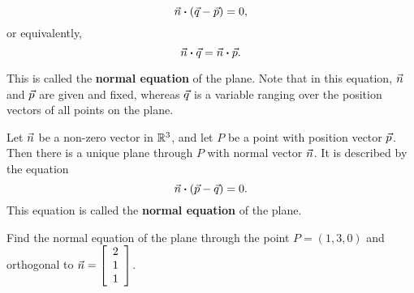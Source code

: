 \documentclass{ximera}
\begin{document}
\begin{equation*}
  \vect{n} \dotprod (\vect{q}-\vect{p}) = 0,
\end{equation*}
or equivalently,
\begin{equation*}
  \vect{n} \dotprod \vect{q} = \vect{n} \dotprod \vect{p}.
\end{equation*}

This is called the \textbf{normal equation} of the plane. Note that in
this equation, $\vect{n}$ and $\vect{p}$ are given and fixed, whereas
$\vect{q}$ is a variable ranging over the position vectors of all
points on the plane.



\begin{definition}\label{def:normal-equation-plane}

  Let $\vect{n}$ be a non-zero vector in $\R^3$, and let $P$ be a
  point with position vector $\vect{p}$. Then there is a unique plane through
  $P$ with normal vector $\vect{n}$. It is described by the equation
  \begin{equation*}
    \vect{n} \dotprod (\vec{p}-\vect{q}) = 0.
  \end{equation*}
  This equation is called the \textbf{normal equation} of the plane.
\end{definition}

\begin{example}\label{ex:normal-equation}

  Find the normal equation of the plane through the point $P=(1,3,0)$
  and orthogonal to $\vect{n}=\startmat{c}2\\1\\1\stopmat$.
\end{example}
\end{document}
